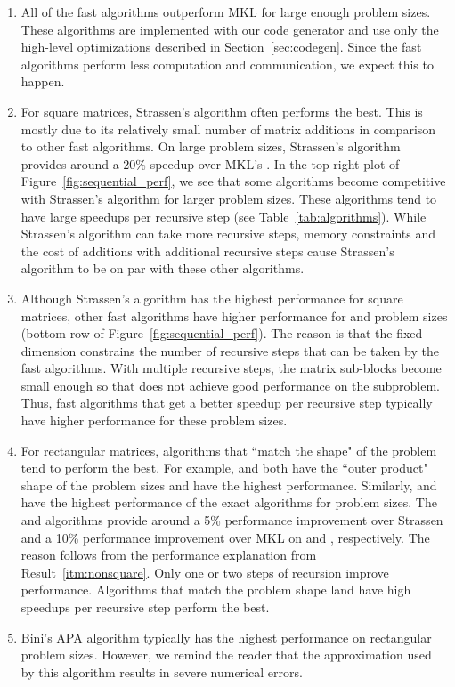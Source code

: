 \documentclass[preprint]{sigplanconf}
\begin{document}
\begin{enumerate}
\item
All of the fast algorithms outperform MKL for large enough problem sizes.
These algorithms are implemented with our code generator and use only the high-level optimizations described in Section~\ref{sec:codegen}.
Since the fast algorithms perform less computation and communication, we expect this to happen.

\item
For square matrices, Strassen's algorithm often performs the best.
This is mostly due to its relatively small number of matrix additions in comparison to other fast algorithms.
On large problem sizes, Strassen's algorithm provides around a 20\% speedup over MKL's .
In the top right plot of Figure~\ref{fig:sequential_perf}, we see that some algorithms become competitive with Strassen's algorithm for larger problem sizes.
These algorithms tend to have large speedups per recursive step (see Table~\ref{tab:algorithms}).
While Strassen's algorithm can take more recursive steps, memory constraints and the cost of additions with additional recursive steps cause Strassen's algorithm to be on par with these other algorithms.

\item\label{itm:nonsquare}
Although Strassen's algorithm has the highest performance for square matrices, other fast algorithms have higher performance for  and  problem sizes (bottom row of Figure~\ref{fig:sequential_perf}).
The reason is that the fixed dimension constrains the number of recursive steps that can be taken by the fast algorithms.
With multiple recursive steps, the matrix sub-blocks become small enough so that  does not achieve good performance on the subproblem.
Thus, fast algorithms that get a better speedup per recursive step typically have higher performance for these problem sizes.


\item
For rectangular matrices, algorithms that ``match the shape" of the problem tend to perform the best.
For example,  and  both have the ``outer product" shape of the  problem sizes and have the highest performance.
Similarly,  and  have the highest performance of the exact algorithms for  problem sizes.
The   and  algorithms provide around a 5\% performance improvement over Strassen and a 10\% performance improvement over MKL on  and , respectively.
The reason follows from the performance explanation from Result~\ref{itm:nonsquare}.
Only one or two steps of recursion improve performance.
Algorithms that match the problem shape land have high speedups per recursive step perform the best.

\item
Bini's  APA algorithm typically has the highest performance on rectangular problem sizes.
However, we remind the reader that the approximation used by this algorithm results in severe numerical errors.

\end{enumerate}
\end{document}

